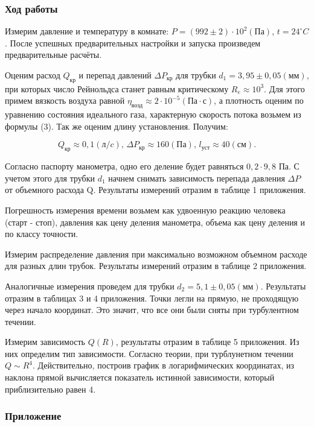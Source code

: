 \documentclass[a4paper, fontsize = 14pt]{article}
\begin{document}
\subsubsection*{Ход работы}

Измерим давление и температуру в комнате: $P = (992\pm2)\cdot10^2(Па)$, $t = 24^{\circ}C$. После успешных предварительных настройки и запуска произведем предварительные расчёты. 

Оценим расход $Q_{кр}$ и перепад давлений $\Delta P_{кр}$ для трубки $d_1=3,95\pm0,05(мм)$, при которых число Рейнольдса станет равным критическому $R_e \approx 10^3$. Для этого примем вязкость воздуха равной $\eta_{возд} \approx 2\cdot10^{-5} (Па\cdot с)$, а плотность оценим по уравнению состояния идеального газа, характерную скорость потока возьмем из формулы (3). Так же оценим длину установления. Получим:

\begin{equation}
	Q_{кр} \approx 0,1 (л/c), \, \Delta P_{кр} \approx 160 (Па), \, l_{уст} \approx 40 (см).
\end{equation}

Согласно паспорту манометра, одно его деление будет равняться $0,2 \cdot 9,8$ Па. С учетом этого для трубки $d_1$ начнем снимать зависимость перепада давления $\Delta P$ от объемного расхода Q. Результаты измерений отразим в таблице 1 приложения.

Погрешность измерения времени возьмем как удвоенную реакцию человека (старт - стоп), давления как цену деления манометра, объема как цену деления и по классу точности. 

Измерим распределение давления при максимально возможном объемном расходе для разных длин трубок. Результаты измерений отразим в таблице 2 приложения.

Аналогичные измерения проведем для трубки $d_2=5,1\pm0,05(мм)$. Результаты отразим в таблицах 3 и 4 приложения. Точки легли на прямую, не проходящую через начало координат. Это значит, что все они были сняты при турбулентном течении. 

Измерим зависимость $Q(R)$, результаты отразим в таблице 5 приложения. Из них определим тип зависимости. Согласно теории, при турблунетном течении $Q\mathtt{\sim}R^4$. Действительно, построив график в логарифмических координатах, из наклона прямой вычисляется показатель истинной зависимости, который приблизительно равен 4.

\subsubsection*{Приложение}
\end{document}
